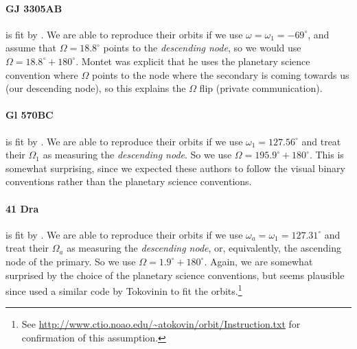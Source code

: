 \documentclass[modern]{aastex61}
\begin{document}
\paragraph{GJ 3305AB} is fit by \citet{montet15}. We are able to reproduce their orbits if we use $\omega = \omega_1 = -69^\circ$, and assume that $\Omega = 18.8^\circ$ points to the \emph{descending node}, so we would use $\Omega = 18.8^\circ + 180^\circ$. Montet was explicit that he uses the planetary science convention where $\Omega$ points to the node where the secondary is coming towards us (our descending node), so this explains the $\Omega$ flip (private communication).

\paragraph{Gl 570BC} is fit by \citet{forveille99}. We are able to reproduce their orbits if we use $\omega_1 = 127.56^\circ$ and treat their $\Omega_1$ as measuring the \emph{descending node}. So we use $\Omega = 195.9^\circ + 180^\circ$. This is somewhat surprising, since we expected these authors to follow the visual binary conventions rather than the planetary science conventions.

\paragraph{41 Dra} is fit by \citet{tokovinin03}. We are able to reproduce their orbits if we use $\omega_a = \omega_1 = 127.31^\circ$ and treat their $\Omega_a$ as measuring the \emph{descending node}, or, equivalently, the ascending node of the primary. So we use $\Omega = 1.9^\circ + 180^\circ$. Again, we are somewhat surprised by the choice of the planetary science conventions, but seems plausible since \citet{forveille99} used a similar code by Tokovinin to fit the orbits.\footnote{See \url{http://www.ctio.noao.edu/~atokovin/orbit/Instruction.txt} for confirmation of this assumption.}
\end{document}
